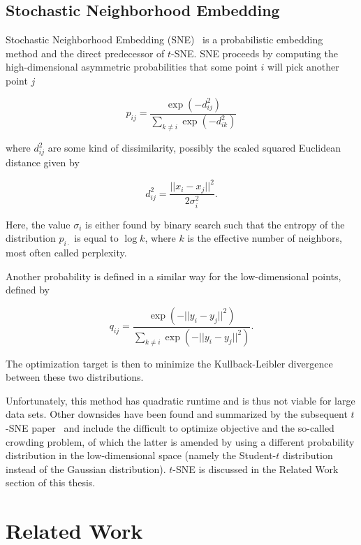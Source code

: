 \section{Stochastic Neighborhood Embedding}

Stochastic Neighborhood Embedding (SNE)~\cite{sne} is a probabilistic
embedding method and the direct predecessor of $t$-SNE. SNE proceeds
by computing the high-dimensional asymmetric probabilities that
some point $i$ will pick another point $j$

\begin{equation}
  p_{ij} = \frac{\exp (-d_{ij}^2)}{\sum_{k \neq i} \exp (-d_{ik}^2)}
\end{equation}

where $d_{ij}^2$ are some kind of dissimilarity, possibly the scaled squared
Euclidean distance given by

\begin{equation}
  d_{ij}^2 = \frac{ ||x_i - x_j||^2}{2\sigma_i^2}.
\end{equation}

Here, the value $\sigma_i$ is either found by binary search such that the
entropy of the distribution $p_{i\cdot}$ is equal to $\log k$, where $k$
is the effective number of neighbors, most often called perplexity.

Another probability is defined in a similar way for the low-dimensional
points, defined by

\begin{equation}
  q_{ij} = \frac{\exp (-||y_i - y_j||^2)}{\sum_{k \neq i} \exp (-||y_i - y_j||^2)}.
\end{equation}

The optimization target is then to minimize the Kullback-Leibler divergence between
these two distributions.

Unfortunately, this method has quadratic runtime and is thus not viable for
large data sets. Other downsides have been found and summarized by the subsequent
$t$-SNE paper~\cite{tsne} and include the difficult to optimize objective and the
so-called crowding problem, of which the latter is amended by using a different
probability distribution in the low-dimensional space (namely the Student-$t$ distribution
instead of the Gaussian distribution). $t$-SNE is discussed in the Related Work
section of this thesis.

\chapter{Related Work}\label{ch:related-work}

